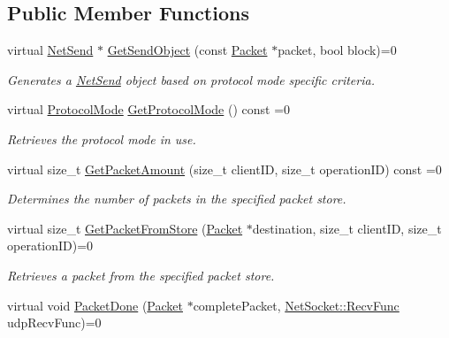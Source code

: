 \subsection*{Public Member Functions}
\begin{DoxyCompactItemize}
\item 
virtual \hyperlink{class_net_send}{NetSend} $\ast$ \hyperlink{class_net_mode_a2a44f68cb6dccbeff90cabbdede0b54e}{GetSendObject} (const \hyperlink{class_packet}{Packet} $\ast$packet, bool block)=0
\begin{DoxyCompactList}\small\item\em Generates a \hyperlink{class_net_send}{NetSend} object based on protocol mode specific criteria. \item\end{DoxyCompactList}\item 
virtual \hyperlink{class_net_mode_a43cfa55ee6a4db66a8d7d6c27f766964}{ProtocolMode} \hyperlink{class_net_mode_a955c73991a8f13465e509f3841071455}{GetProtocolMode} () const =0
\begin{DoxyCompactList}\small\item\em Retrieves the protocol mode in use. \item\end{DoxyCompactList}\item 
virtual size\_\-t \hyperlink{class_net_mode_a5e5d20657ffc037022adc4b81fe2df6d}{GetPacketAmount} (size\_\-t clientID, size\_\-t operationID) const =0
\begin{DoxyCompactList}\small\item\em Determines the number of packets in the specified packet store. \item\end{DoxyCompactList}\item 
virtual size\_\-t \hyperlink{class_net_mode_a7231dcd15fc1896f61d7ac80c3e9b4ba}{GetPacketFromStore} (\hyperlink{class_packet}{Packet} $\ast$destination, size\_\-t clientID, size\_\-t operationID)=0
\begin{DoxyCompactList}\small\item\em Retrieves a packet from the specified packet store. \item\end{DoxyCompactList}\item 
virtual void \hyperlink{class_net_mode_a6dfa7ab2954246efda52867ef345a6bb}{PacketDone} (\hyperlink{class_packet}{Packet} $\ast$completePacket, \hyperlink{class_net_socket_a52b5f4de8d0a47fd8620f542b21c076c}{NetSocket::RecvFunc} udpRecvFunc)=0

\end{DoxyCompactItemize}
